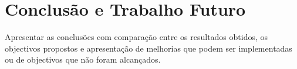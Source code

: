 \chapter{Conclusão e Trabalho Futuro}

Apresentar as conclusões com comparação entre os resultados obtidos, os objectivos propostos e apresentação de melhorias que podem ser implementadas ou de objectivos que não foram alcançados.